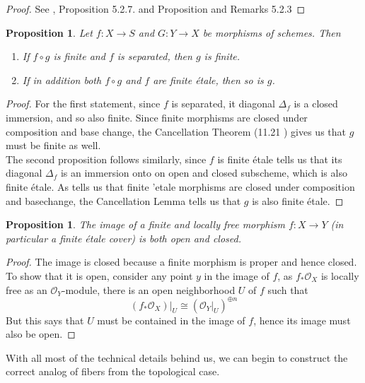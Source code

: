 \documentclass{article}
\theoremstyle{definition}
\theoremstyle{remark}
\theoremstyle{plain}
\newtheorem{proposition}[theorem]{Proposition}
\newcommand{\mc}[1]{\mathcal{#1}}
\begin{document}
\begin{proof}
	See \cite{Szamuely}, Proposition 5.2.7. and Proposition and Remarks 5.2.3
\end{proof}

\begin{proposition}
	Let $f\colon X \to S$ and $G: Y \to X$ be morphisms of schemes. 
	Then 
	\begin{enumerate}
		\item If $f \circ g$ is finite and $f$ is separated, then $g$ is finite.
		\item If in addition both $f \circ g$ and $f$ are finite \'etale, then so is $g$.
	\end{enumerate}
	
\end{proposition}

\begin{proof}	
	For the first statement, since $f$ is separated, it diagonal $\Delta_f$ is a closed immersion, and so also finite. 
	Since finite morphisms are closed under composition and base change, the Cancellation Theorem (11.21 \cite{therisingsea}) gives us that $g$ must be finite as well.\\
\indent The second proposition follows similarly, since $f$ is finite \'etale  tells us that its diagonal $\Delta_f$ is an immersion onto on open and closed subscheme, which is also finite \'etale.
As  tells us that finite 'etale morphisms are closed under composition and basechange, the Cancellation Lemma tells us that $g$ is also finite \'etale.
\end{proof}

\begin{proposition}
	The image of a finite and locally free morphism $f: X \to Y$ (in particular a finite \'etale cover) is both open and closed.
\end{proposition}

\begin{proof}
	The image is closed because a finite morphism is proper and hence closed.
	To show that it is open, consider any point $y$ in the image of $f$, as $f_* \mc{O}_X$ is locally free as an $\mc{O}_Y$-module, there is an open neighborhood $U$ of $f$ such that 
	\[(f_* \mc{O}_X)|_U \cong (\mc{O}_Y|_U)^{\oplus n}\]
	But this says that $U$ must be contained in the image of $f$, hence its image must also be open.
\end{proof}

With all most of the technical details behind us, we can begin to construct the correct analog of fibers from the topological case.
\end{document}
